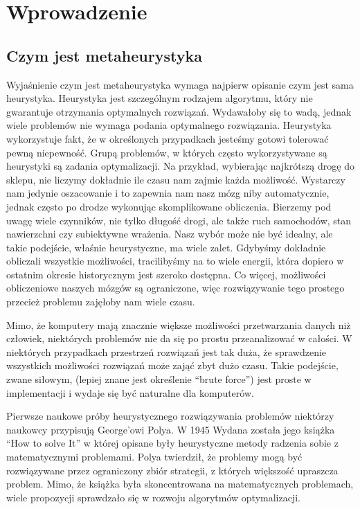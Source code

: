 \documentclass[twoside]{iisthesis}
\begin{document}
\chapter{Wprowadzenie}

\section{Czym jest metaheurystyka}
Wyjaśnienie czym jest metaheurystyka wymaga najpierw opisanie czym jest sama heurystyka. Heurystyka jest szczególnym rodzajem algorytmu, który nie gwarantuje otrzymania optymalnych rozwiązań. Wydawałoby się to wadą, jednak wiele problemów nie wymaga podania optymalnego rozwiązania. Heurystyka wykorzystuje fakt, że w określonych przypadkach jesteśmy gotowi 
tolerować pewną niepewność. Grupą problemów, w których często wykorzystywane są heurystyki są zadania optymalizacji. Na przykład, wybierając najkrótszą drogę do sklepu, nie liczymy dokładnie ile czasu nam zajmie każda możliwość. Wystarczy nam jedynie oszacowanie i to zapewnia nam nasz mózg niby automatycznie, jednak często po drodze wykonując skomplikowane obliczenia. Bierzemy pod uwagę wiele czynników, nie tylko długość drogi, ale także ruch samochodów, stan nawierzchni czy subiektywne wrażenia. Nasz wybór może nie być idealny, ale takie podejście, właśnie heurystyczne, ma wiele zalet. Gdybyśmy dokładnie obliczali wszystkie możliwości, tracilibyśmy na to wiele energii, która dopiero w ostatnim okresie historycznym jest szeroko dostępna. Co więcej, możliwości obliczeniowe naszych mózgów są ograniczone, więc rozwiązywanie tego prostego przecież problemu zajęłoby nam wiele czasu.

Mimo, że komputery mają znacznie większe możliwości przetwarzania danych niż człowiek, niektórych problemów nie da się po prostu przeanalizować w całości. W niektórych przypadkach przestrzeń rozwiązań jest tak duża, że sprawdzenie wszystkich możliwości rozwiązań może zająć zbyt dużo czasu. Takie podejście, zwane siłowym, (lepiej znane jest określenie ``brute force'') jest proste w implementacji i wydaje się być naturalne dla komputerów.

Pierwsze naukowe próby heurystycznego rozwiązywania problemów niektórzy naukowcy \cite{history-meta} przypisują George'owi Polya. W 1945 Wydana została jego książka ``How to solve It'' \cite{polya} w której opisane były heurystyczne metody radzenia sobie z matematycznymi problemami. Polya twierdził, że problemy mogą być rozwiązywane przez ograniczony zbiór strategii, z których większość upraszcza problem. Mimo, że książka była skoncentrowana na matematycznych problemach, wiele propozycji sprawdzało się w rozwoju algorytmów optymalizacji.
\end{document}
